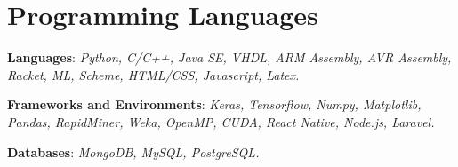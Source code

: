 \section{\sc Programming Languages}
	\textbf{Languages}{: \textit{Python, C/C++, Java SE, VHDL, ARM Assembly, AVR Assembly, Racket, ML, Scheme, HTML/CSS, Javascript, Latex.}}
	\hfill

	\textbf{Frameworks and Environments}{: \textit{Keras, Tensorflow, Numpy, Matplotlib, Pandas, RapidMiner, Weka, OpenMP, CUDA, React Native, Node.js, Laravel.}}
	\hfill

	\textbf{Databases}{: \textit{MongoDB, MySQL, PostgreSQL.}}
	\hfill
	
\endinput
